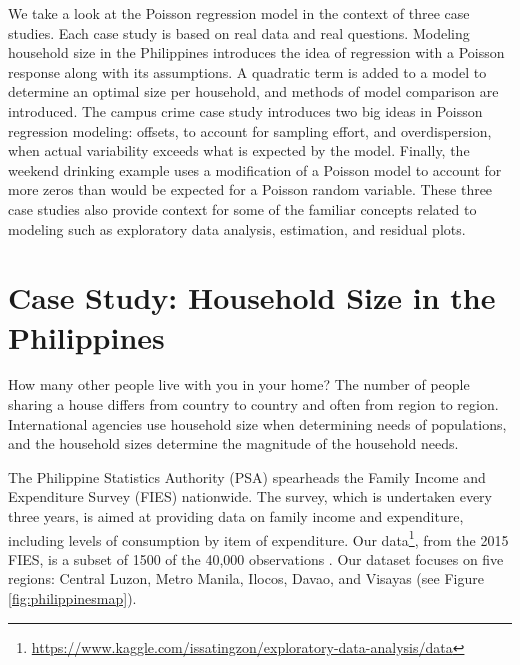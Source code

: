 \documentclass[
]{krantz}
\renewcommand{\href}[2]{#2\footnote{\url{#1}}}
\begin{document}
We take a look at the Poisson regression model in the context of three case studies. Each case study is based on real data and real questions. Modeling household size in the Philippines introduces the idea of regression with a Poisson response along with its assumptions. A quadratic term is added to a model to determine an optimal size per household, and methods of model comparison are introduced. The campus crime case study introduces two big ideas in Poisson regression modeling: offsets, to account for sampling effort, and overdispersion, when actual variability exceeds what is expected by the model. Finally, the weekend drinking example uses a modification of a Poisson model to account for more zeros than would be expected for a Poisson random variable. These three case studies also provide context for some of the familiar concepts related to modeling such as exploratory data analysis, estimation, and residual plots.

\hypertarget{case-study-household-size-in-the-philippines}{%
\section{Case Study: Household Size in the Philippines}\label{case-study-household-size-in-the-philippines}}

How many other people live with you in your home? The number of people sharing a house differs from country to country and often from region to region. International agencies use household size when determining needs of populations, and the household sizes determine the magnitude of the household needs.

The Philippine Statistics Authority (PSA) spearheads the Family Income and Expenditure Survey (FIES) nationwide. The survey, which is undertaken every three years, is aimed at providing data on family income and expenditure, including levels of consumption by item of expenditure. Our \href{https://www.kaggle.com/issatingzon/exploratory-data-analysis/data}{data}, from the 2015 FIES, is a subset of 1500 of the 40,000 observations \citep{PSA}. Our dataset focuses on five regions: Central Luzon, Metro Manila, Ilocos, Davao, and Visayas (see Figure \ref{fig:philippinesmap}).
\end{document}
